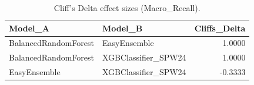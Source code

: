 \begin{table}[t]
\centering
\begin{tabular}{llr}
\toprule
Model_A & Model_B & Cliffs_Delta \\
\midrule
BalancedRandomForest & EasyEnsemble & 1.0000 \\
BalancedRandomForest & XGBClassifier_SPW24 & 1.0000 \\
EasyEnsemble & XGBClassifier_SPW24 & -0.3333 \\
\bottomrule
\end{tabular}
\caption{Cliff's Delta effect sizes (Macro_Recall).}
\label{tab:cliffs_Macro_Recall}
\end{table}